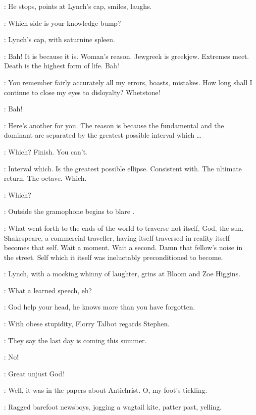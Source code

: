 :
He stops,
points at Lynch's cap,
smiles,
laughs.

\Stephen:
Which side is your knowledge bump?

:
Lynch's cap,
with saturnine spleen.

\Cap:
Bah!
It is because it is.
Woman's reason.
Jewgreek is greekjew.
Extremes meet.
Death is the highest form of life.
Bah!

\Stephen:
You remember fairly accurately all my errors,
boasts,
mistakes.
How long shall I continue to close my eyes to disloyalty?
Whetstone!

\Cap[1]:
Bah!

\Stephen:
Here's another for you.
The reason is because the fundamental and the dominant
are separated by the greatest possible interval which \ldots

\Cap:
Which?
Finish.
You can't.

\Stephen:
Interval which.
Is the greatest possible ellipse.
Consistent with.
The ultimate return.
The octave.
Which.

\Cap:
Which?

:
Outside the gramophone begins to blare .

\Stephen:
What went forth to the ends of the world to traverse not itself,
God,
the sun,
Shakespeare,
a commercial traveller,
having itself traversed in reality itself becomes that self.
Wait a moment.
Wait a second.
Damn that fellow's noise in the street.
Self which it itself was ineluctably preconditioned to become.

:
Lynch,
with a mocking whinny of laughter,
grins at Bloom and Zoe Higgins.

\Lynch:
What a learned speech,
eh?

\Zoe:
God help your head,
he knows more than you have forgotten.

:
With obese stupidity,
Florry Talbot regards Stephen.

\Florry:
They say the last day is coming this summer.

\Kitty:
No!

\Zoe:
Great unjust God!

\Florry:
Well,
it was in the papers about Antichrist.
O,
my foot's tickling.

:
Ragged barefoot newsboys,
jogging a wagtail kite,
patter past,
yelling.

